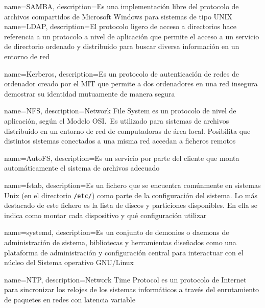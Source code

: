 {
  name=SAMBA,
  description={Es una implementación libre del protocolo de archivos
    compartidos de Microsoft Windows para sistemas de tipo UNIX}
}
{
  name=LDAP,
  description={El protocolo ligero de acceso a directorios hace referencia a un
    protocolo a nivel de aplicación que permite el acceso a un servicio de
    directorio ordenado y distribuido para buscar diversa información en un
    entorno de red}
}

{
  name=Kerberos,
  description={Es un protocolo de autenticación de redes de ordenador creado
    por el MIT que permite a dos ordenadores en una red insegura demostrar
    su identidad mutuamente de manera segura}
}

{
  name=NFS,
  description={Network File System es un
    protocolo de nivel de aplicación, según el Modelo OSI.~Es utilizado para
    sistemas de archivos distribuido en un entorno de red de computadoras de
    área local. Posibilita que distintos sistemas conectados a una misma red
    accedan a ficheros remotos}
}

{
  name=AutoFS,
  description={Es un servicio por parte del cliente que monta
    automáticamente el sistema de archivos adecuado}
}

{
  name=fstab,
  description={Es un fichero que se encuentra comúnmente en
    sistemas Unix (en el directorio \texttt{/etc/}) como parte de la
    configuración del sistema. Lo más destacado de este fichero es la lista de
    discos y particiones disponibles. En ella se indica como montar cada
    dispositivo y qué configuración utilizar}
}

{
  name=systemd,
  description={Es un conjunto de demonios o daemons de
    administración de sistema, bibliotecas y herramientas diseñados como una
    plataforma de administración y configuración central para interactuar con
    el núcleo del Sistema operativo GNU/Linux}
}

{
  name=NTP,
  description={Network Time Protocol es un protocolo de Internet para
    sincronizar los relojes de los sistemas informáticos a través del
    enrutamiento de paquetes en redes con latencia variable
  }
}





